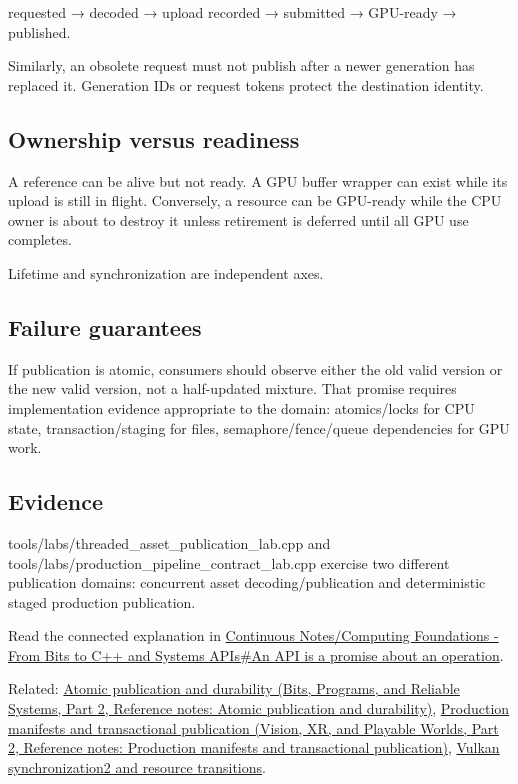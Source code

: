 requested → decoded → upload recorded → submitted → GPU-ready → published.

Similarly, an obsolete request must not publish after a newer generation has replaced it. Generation IDs or request tokens protect the destination identity.

\subsection{Ownership versus readiness}\label{appendix-fdae7ff0a23f-ownership-versus-readiness}

\hypertarget{appendix-fdae7ff0a23f-ownership-versus-readiness}{}

A reference can be alive but not ready. A GPU buffer wrapper can exist while its upload is still in flight. Conversely, a resource can be GPU-ready while the CPU owner is about to destroy it unless retirement is deferred until all GPU use completes.

Lifetime and synchronization are independent axes.

\subsection{Failure guarantees}\label{appendix-fdae7ff0a23f-failure-guarantees}

\hypertarget{appendix-fdae7ff0a23f-failure-guarantees}{}

If publication is atomic, consumers should observe either the old valid version or the new valid version, not a half-updated mixture. That promise requires implementation evidence appropriate to the domain: atomics/locks for CPU state, transaction/staging for files, semaphore/fence/queue dependencies for GPU work.

\subsection{Evidence}\label{appendix-fdae7ff0a23f-evidence}

\hypertarget{appendix-fdae7ff0a23f-evidence}{}

tools/labs/threaded\_asset\_publication\_lab.cpp and tools/labs/production\_pipeline\_contract\_lab.cpp exercise two different publication domains: concurrent asset decoding/publication and deterministic staged production publication.

Read the connected explanation in \hyperref[01-foundations-i-ch008-an-api-is-a-promise-about-an-operation]{Continuous Notes/Computing Foundations - From Bits to C++ and Systems APIs\#An API is a promise about an operation}.

Related: \href{../01-Bits-Programs-and-Reliable-Systems-P02/main.pdf\#nameddest=appendix-e89a8f290ef5}{Atomic publication and durability (Bits, Programs, and Reliable Systems, Part 2, Reference notes: Atomic publication and durability)}, \href{../07-Vision-XR-and-Playable-Worlds-P02/main.pdf\#nameddest=appendix-91eaa3cbdbc3}{Production manifests and transactional publication (Vision, XR, and Playable Worlds, Part 2, Reference notes: Production manifests and transactional publication)}, \hyperref[appendix-f15ce0d9c170]{Vulkan synchronization2 and resource transitions}.
